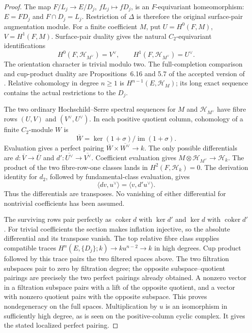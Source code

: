 \begin{proof}
The map $F/L_j\to E/D_j$, $fL_j\mapsto fD_j$, is an
$F$-equivariant homeomorphism: $E=FD_j$ and
$F\cap D_j=L_j$.  Restriction of $\Delta$ is therefore
the original surface-pair augmentation module.  For a
finite coefficient $M$, put $U=H^0(F,M)$, $V=H^1(F,M)$.
Surface-pair duality gives the natural $C_2$-equivariant
identifications
\[
 H^0(F,\mathscr H_{M^\vee})=V^\vee,
 \qquad H^1(F,\mathscr H_{M^\vee})=U^\vee.                  \tag{C.6.2}
\]
The orientation character is trivial modulo two.  The
full-completion comparison and cup-product duality are
Propositions~6.16 and 5.7 of the accepted version of
\cite{CEWilkes2019}.  Relative cohomology in degree
$n\geq1$ is $H^{n-1}(E,\mathscr H_M)$; its long exact
sequence contains the actual restrictions to the $D_j$.

The two ordinary Hochschild--Serre spectral sequences
for $M$ and $\mathscr H_{M^\vee}$ have fibre rows
$(U,V)$ and $(V^\vee,U^\vee)$.  In each positive
quotient column, cohomology of a finite $C_2$-module $W$
is
\[
 \overline W=\ker(1+\sigma)/\operatorname{im}(1+\sigma).
\]
Evaluation gives a perfect pairing
$\overline W\times\overline{W^\vee}\to k$.
The only possible differentials are
$d:\overline V\to\overline U$ and
$d':\overline{U^\vee}\to\overline{V^\vee}$.
Coefficient evaluation gives
$M\otimes\mathscr H_{M^\vee}\to\mathscr H_k$.
The product of the two fibre-row-one classes lands in
$H^2(F,\mathscr H_k)=0$.  The derivation identity for
$d_2$, followed by fundamental-class evaluation, gives
\[
                  \langle dv,u^\vee\rangle
                    =\langle v,d'u^\vee\rangle.              \tag{C.6.3}
\]
Thus the differentials are transposes.  No vanishing
of either differential for nontrivial coefficients
has been assumed.

The surviving rows pair perfectly as
$\operatorname{coker}d$ with $\ker d'$ and $\ker d$
with $\operatorname{coker}d'$.  For trivial coefficients
the section makes inflation injective, so the absolute
differential and its transpose vanish.  The top relative
fibre class supplies compatible traces
$H^n(E,\{D_j\};k)\to ku^{n-2}\to k$ in high degrees.
Cup product followed by this trace pairs the two
filtered spaces above.  The two filtration subspaces
pair to zero by filtration degree; the opposite
subspace--quotient pairings are precisely the two
perfect pairings already obtained.  A nonzero vector
in a filtration subspace pairs with a lift of the
opposite quotient, and a vector with nonzero quotient
pairs with the opposite subspace.  This proves
nondegeneracy on the full spaces.  Multiplication by
$u$ is an isomorphism in sufficiently high degree,
as is seen on the positive-column cyclic complex.
It gives the stated localized perfect pairing.


\end{proof}
